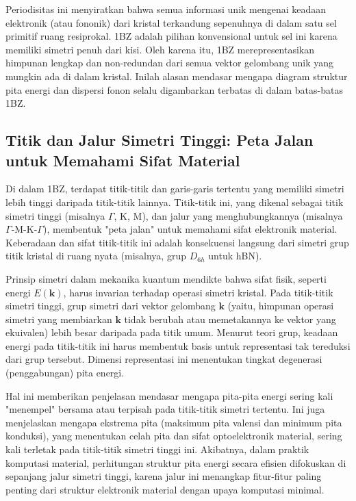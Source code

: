Periodisitas ini menyiratkan bahwa semua informasi unik mengenai keadaan elektronik (atau fononik) dari kristal terkandung sepenuhnya di dalam satu sel primitif ruang resiprokal. 1BZ adalah pilihan konvensional untuk sel ini karena memiliki simetri penuh dari kisi. Oleh karena itu, 1BZ merepresentasikan himpunan lengkap dan non-redundan dari semua vektor gelombang unik yang mungkin ada di dalam kristal. Inilah alasan mendasar mengapa diagram struktur pita energi dan dispersi fonon selalu digambarkan terbatas di dalam batas-batas 1BZ.

\subsection{Titik dan Jalur Simetri Tinggi: Peta Jalan untuk Memahami Sifat Material}
Di dalam 1BZ, terdapat titik-titik dan garis-garis tertentu yang memiliki simetri lebih tinggi daripada titik-titik lainnya. Titik-titik ini, yang dikenal sebagai titik simetri tinggi (misalnya $\Gamma$, K, M), dan jalur yang menghubungkannya (misalnya $\Gamma$-M-K-$\Gamma$), membentuk "peta jalan" untuk memahami sifat elektronik material. Keberadaan dan sifat titik-titik ini adalah konsekuensi langsung dari simetri grup titik kristal di ruang nyata (misalnya, grup $D_{6h}$ untuk hBN).

Prinsip simetri dalam mekanika kuantum mendikte bahwa sifat fisik, seperti energi $E(\mathbf{k})$, harus invarian terhadap operasi simetri kristal. Pada titik-titik simetri tinggi, grup simetri dari vektor gelombang $\mathbf{k}$ (yaitu, himpunan operasi simetri yang membiarkan $\mathbf{k}$ tidak berubah atau memetakannya ke vektor yang ekuivalen) lebih besar daripada pada titik umum. Menurut teori grup, keadaan energi pada titik-titik ini harus membentuk basis untuk representasi tak tereduksi dari grup tersebut. Dimensi representasi ini menentukan tingkat degenerasi (penggabungan) pita energi.

Hal ini memberikan penjelasan mendasar mengapa pita-pita energi sering kali "menempel" bersama atau terpisah pada titik-titik simetri tertentu. Ini juga menjelaskan mengapa ekstrema pita (maksimum pita valensi dan minimum pita konduksi), yang menentukan celah pita dan sifat optoelektronik material, sering kali terletak pada titik-titik simetri tinggi ini. Akibatnya, dalam praktik komputasi material, perhitungan struktur pita energi secara efisien difokuskan di sepanjang jalur simetri tinggi, karena jalur ini menangkap fitur-fitur paling penting dari struktur elektronik material dengan upaya komputasi minimal.

